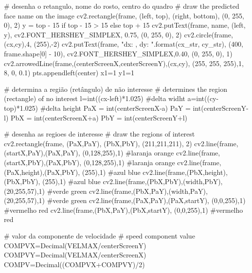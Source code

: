 \begin{apendicesenv}
\begin{python_}
		# desenha o retangulo, nome do rosto, centro do quadro
		# draw the predicted face name on the image
		cv2.rectangle(frame, (left, top), (right, bottom),
		(0, 255, 0), 2)
		y = top - 15 if top - 15 > 15 else top + 15
		cv2.putText(frame, name, (left, y), cv2.FONT_HERSHEY_SIMPLEX,
		0.75, (0, 255, 0), 2)
		cv2.circle(frame,(cx,cy),4, (255),-2)
		cv2.putText(frame, "dx: {}, dy: {}".format(cx_str, cy_str),
		(400, frame.shape[0] - 10), cv2.FONT_HERSHEY_SIMPLEX,0.40, (0, 255, 0), 1)
		cv2.arrowedLine(frame,(centerScreenX,centerScreenY),(cx,cy), 
		(255, 255, 255),1, 8, 0, 0.1)
		pts.appendleft(center)
		x1=1
		y1=1
		
		
		# determina a região (retângulo) de não interesse  
		# determines the region (rectangle) of no interest
		l=int((cx-left)*1.025) #delta widht
		a=int((cy-top)*1.025) #delta height
		PaX = int(centerScreenX-a)
		PaY = int(centerScreenY-l)
		PbX = int(centerScreenX+a)
		PbY = int(centerScreenY+l)
		
		# desenha as regioes de interesse	
		# draw the regions of interest
		cv2.rectangle(frame, (PaX,PaY), (PbX,PbY), (211,211,211), 2)
		cv2.line(frame,(startX,PaY),(PaX,PaY), (0,128,255),1) #laranja orange
		cv2.line(frame,(startX,PbY),(PaX,PbY), (0,128,255),1) #laranja orange
		cv2.line(frame,(PaX,height),(PaX,PbY), (255),1) #azul blue
		cv2.line(frame,(PbX,height),(PbX,PbY), (255),1) #azul blue
		cv2.line(frame,(PbX,PbY),(width,PbY), (20,255,57),1) #verde green
		cv2.line(frame,(PbX,PaY),(width,PaY), (20,255,57),1) #verde green
		cv2.line(frame,(PaX,PaY),(PaX,startY), (0,0,255),1) #vermelho red
		cv2.line(frame,(PbX,PaY),(PbX,startY), (0,0,255),1) #vermelho red
		
		# valor da componente de velocidade
		# speed component value
		COMPVX=Decimal(VELMAX/centerScreenY)
		COMPVY=Decimal(VELMAX/centerScreenX)
		COMPV=Decimal((COMPVX+COMPVY)/2)
		

\end{python_}
\end{apendicesenv}
